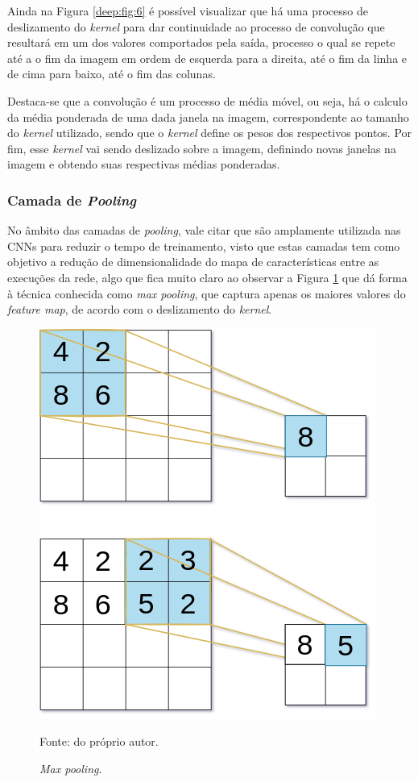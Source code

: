 Ainda na Figura \ref{deep:fig:6} é possível visualizar que há uma processo de deslizamento do \textit{kernel} para dar continuidade ao processo de convolução que resultará em um dos valores comportados pela saída, processo o qual se repete até a o fim da imagem em ordem de esquerda para a direita, até o fim da linha e de cima para baixo, até o fim das colunas.

Destaca-se que a convolução é um processo de média móvel, ou seja, há o calculo da média ponderada de uma dada janela na imagem, correspondente ao tamanho do \textit{kernel} utilizado, sendo que o \textit{kernel} define os pesos dos respectivos pontos. Por fim, esse \textit{kernel} vai sendo deslizado sobre a imagem, definindo novas janelas na imagem e obtendo suas respectivas médias ponderadas.


\subsubsection{Camada de \textit{Pooling}}
\label{deep:pooling}

No âmbito das camadas de \textit{pooling}, vale citar que são amplamente utilizada nas CNNs para reduzir o tempo de treinamento, visto que estas camadas tem como objetivo a redução de dimensionalidade do mapa de características entre as execuções da rede, algo que fica muito claro ao observar a Figura \ref{deep:fig:7} que dá forma à técnica conhecida como \textit{max pooling}, que captura apenas os maiores valores do \textit{feature map}, de acordo com o deslizamento do \textit{kernel}.

\begin{figure}[H]
    \centering
    \caption{\textit{Max pooling}.}
    \includegraphics[width=0.5\linewidth]{recursos/imagens/deep/max_pooling.png}
    \label{deep:fig:7}
    
    \vspace*{1 cm}
    Fonte: do próprio autor.
\end{figure}

